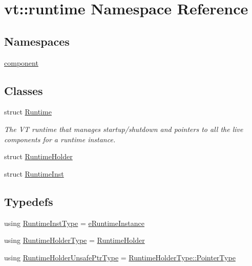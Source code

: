 \hypertarget{namespacevt_1_1runtime}{}\section{vt\+:\+:runtime Namespace Reference}
\label{namespacevt_1_1runtime}
\subsection*{Namespaces}
\begin{DoxyCompactItemize}
\item 
 \hyperlink{namespacevt_1_1runtime_1_1component}{component}
\end{DoxyCompactItemize}
\subsection*{Classes}
\begin{DoxyCompactItemize}
\item 
struct \hyperlink{structvt_1_1runtime_1_1_runtime}{Runtime}
\begin{DoxyCompactList}\small\item\em The VT runtime that manages startup/shutdown and pointers to all the live components for a runtime instance. \end{DoxyCompactList}\item 
struct \hyperlink{structvt_1_1runtime_1_1_runtime_holder}{Runtime\+Holder}
\item 
struct \hyperlink{structvt_1_1runtime_1_1_runtime_inst}{Runtime\+Inst}
\end{DoxyCompactItemize}
\subsection*{Typedefs}
\begin{DoxyCompactItemize}
\item 
using \hyperlink{namespacevt_1_1runtime_a012376d47cd009c2e6305f17de9fcfe9}{Runtime\+Inst\+Type} = \hyperlink{namespacevt_1_1runtime_afca910c1b38b3975f7c1da8001a77d58}{e\+Runtime\+Instance}
\item 
using \hyperlink{namespacevt_1_1runtime_ab09d044cce417fbcdb7e1e29b7aabbc3}{Runtime\+Holder\+Type} = \hyperlink{structvt_1_1runtime_1_1_runtime_holder}{Runtime\+Holder}
\item 
using \hyperlink{namespacevt_1_1runtime_a69931905b04961a874e4a70a43083a83}{Runtime\+Holder\+Unsafe\+Ptr\+Type} = \hyperlink{structvt_1_1runtime_1_1_runtime_holder_a9740e8aa7487fcf38b67a7e160d7b046}{Runtime\+Holder\+Type\+::\+Pointer\+Type}
\end{DoxyCompactItemize}
